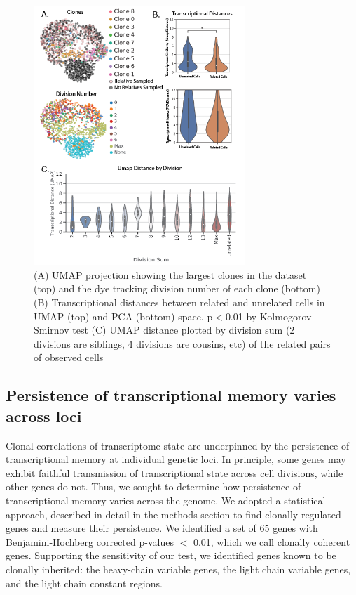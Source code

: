 \begin{figure}[htb!]
\centering
\includegraphics[width=8cm, keepaspectratio]{figs/prelim_InVitro/BCellLineagePaper_Figure 2.png}
\caption[Transcriptomic similarity of clones \textit{in vitro}]{(A) UMAP projection showing the largest clones in the dataset (top) and the dye tracking division number of each clone (bottom) (B) Transcriptional distances between related and unrelated cells in UMAP (top) and PCA (bottom) space. p$<$0.01 by Kolmogorov-Smirnov test (C) UMAP distance plotted by division sum (2 divisions are siblings, 4 divisions are cousins, etc) of the related pairs of observed cells}
\label{fig:paper2_prelimfig_2}
\end{figure}



\subsection{Persistence of transcriptional memory varies across loci}
Clonal correlations of transcriptome state are underpinned by the persistence of transcriptional memory at individual genetic loci. In principle, some genes may exhibit faithful transmission of transcriptional state across cell divisions, while other genes do not. Thus, we sought to determine how persistence of transcriptional memory varies across the genome.
We adopted a statistical approach, described in detail in the methods section to find clonally regulated genes and measure their persistence. We identified a set of 65 genes with Benjamini-Hochberg corrected p-values $<$ 0.01, which we call clonally coherent genes. Supporting the sensitivity of our test, we identified genes known to be clonally inherited: the heavy-chain variable genes, the light chain variable genes, and the light chain constant regions. 

